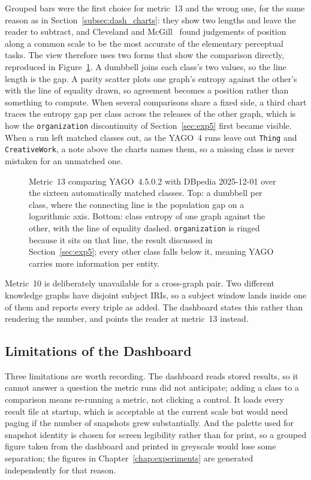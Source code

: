 Grouped bars were the first choice for metric~13 and the wrong one, for the same
reason as in Section~\ref{subsec:dash_charts}: they show two lengths and leave
the reader to subtract, and Cleveland and McGill~\cite{cleveland1984graphical}
found judgements of position along a common scale to be the most accurate of
the elementary perceptual tasks. The view therefore uses two forms that show the
comparison directly, reproduced in Figure~\ref{fig:dash_crosskg}. A dumbbell
joins each class's two values, so the line length is the gap. A parity scatter
plots one graph's entropy against the other's with the line of equality drawn,
so agreement becomes a position rather than something to compute. When several
comparisons share a fixed side, a third chart traces the entropy gap per class
across the releases of the other graph, which is how the \texttt{organization}
discontinuity of Section~\ref{sec:exp5} first became visible. When a run left
matched classes out, as the YAGO~4 runs leave out \texttt{Thing} and
\texttt{CreativeWork}, a note above the charts names them, so a missing class
is never mistaken for an unmatched one.

\begin{figure}[htbp]
  \centering
  \caption[]{Metric~13 comparing YAGO~4.5.0.2
    with DBpedia 2025-12-01 over the sixteen automatically matched classes. Top:
    a dumbbell per class, where the connecting line is the population gap on a
    logarithmic axis. Bottom: class entropy of one graph against the other, with
    the line of equality dashed. \texttt{organization} is ringed because it sits
    on that line, the result discussed in Section~\ref{sec:exp5}; every other
    class falls below it, meaning YAGO carries more information per entity.}
  \label{fig:dash_crosskg}
\end{figure}

Metric~10 is deliberately unavailable for a cross-graph pair. Two different
knowledge graphs have disjoint subject IRIs, so a subject window lands inside one
of them and reports every triple as added. The dashboard states this rather than
rendering the number, and points the reader at metric~13 instead.

\subsection{Limitations of the Dashboard}
\label{subsec:dash_limitations}

Three limitations are worth recording. The dashboard reads stored results, so it
cannot answer a question the metric runs did not anticipate; adding a class to a
comparison means re-running a metric, not clicking a control. It loads every
result file at startup, which is acceptable at the current scale but would need
paging if the number of snapshots grew substantially. And the palette used for
snapshot identity is chosen for screen legibility rather than for print, so a
grouped figure taken from the dashboard and printed in greyscale would lose some
separation; the figures in Chapter~\ref{chap:experiments} are generated
independently for that reason.
